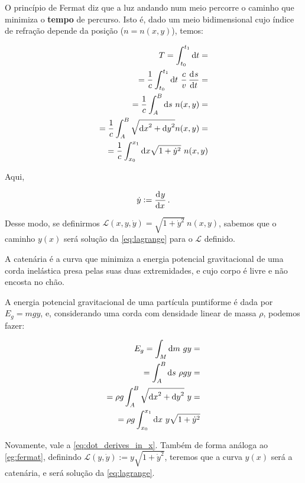 \begin{eg}
    \label{eg:fermat}
    O princípio de Fermat diz que a luz andando num meio percorre o caminho que
    minimiza o \textbf{tempo} de percurso. Isto é, dado um meio bidimensional
    cujo índice de refração depende da posição ($n = n(x,y)$), temos:

    \begin{equation*}
        \begin{aligned}
            T = \int_{t_0}^{t_1} \dif t =&  \\
            = \frac{1}{c} \int_{t_0}^{t_1} \dif t~\frac{c}{v} \dod{s}{t} =& \\
            = \frac{1}{c} \int_{A}^{B} \dif s~n(x,y)  =& \\
            = \frac{1}{c} \int_{A}^{B} \sqrt{{\dif x}^2 + {\dif y}^2} n(x,y) =&
            \\
            = \frac{1}{c} \int_{x_0}^{x_1} \dif x \sqrt{1 + {\dot y}^2} ~ n(x,y)
        \end{aligned}
    \end{equation*}

    Aqui,

    \begin{equation}
        \dot y := \dod{y}{x} \text{.}
        \label{eq:dot_derives_in_x}
    \end{equation}

    Desse modo, se definirmos $\mathcal{L}(x, y, \dot y) = \sqrt{1 + {\dot
    y}^2}~n(x,y)$, sabemos que o caminho $y(x)$ será solução da
    \autoref{eq:lagrange} para o $\mathcal{L}$ definido.

\end{eg}


\begin{eg}[Catenária]
    \label{eg:catenaria}
    A catenária é a curva que minimiza a energia potencial gravitacional de uma
    corda inelástica presa pelas suas duas extremidades, e cujo corpo é livre e
    não encosta no chão.

    A energia potencial gravitacional de uma partícula puntiforme é dada por
    $E_g = mgy$, e, considerando uma corda com densidade linear de massa $\rho$,
    podemos fazer:

    \begin{equation}
        \begin{aligned}
            E_g = \int_M \dif m ~ gy =& \\
            = \int_A^B \dif s~\rho gy =& \\
            = \rho g \int_A^B \sqrt{{\dif x}^2 + {\dif y}^2}~y =& \\
            = \rho g \int_{x_0}^{x_1} \dif x~y \sqrt{1 + {\dot y}^2}
        \end{aligned}
    \end{equation}

    Novamente, vale a \autoref{eq:dot_derives_in_x}. Também de forma análoga ao
    \autoref{eg:fermat}, definindo $\mathcal{L}(y, \dot y) := y \sqrt{1 + {\dot
    y}^2}$, teremos que a curva $y(x)$ será a catenária, e será solução da
    \autoref{eq:lagrange}.

\end{eg}

